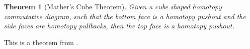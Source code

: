 \documentclass{scrartcl}
\let\emph\relax
\newcommand{\emphi}[1]{\index{#1}\emph{#1}}
\theoremstyle{plain}
\newtheorem{theorem}{Theorem}[section]
\theoremstyle{definition}
\newtheorem{definition}[theorem]{Definition}
\newcommand{\cat}[1]{\mathbcal{#1}}
\let\xto\xrightarrow
\let\xfrom\xleftarrow
\renewcommand{\coprod}{\mathbin{\amalg}}
\begin{document}
\begin{theorem}[Mather's Cube Theorem]\label{thm:mather-cube}
    Given a cube shaped homotopy commutative diagram, such that the bottom face is a homotopy pushout and the side faces are homotopy pullbacks, then the top face is a homotopy pushout.
\end{theorem}
This is a theorem from \cite{mather1976pull}.





\end{document}
